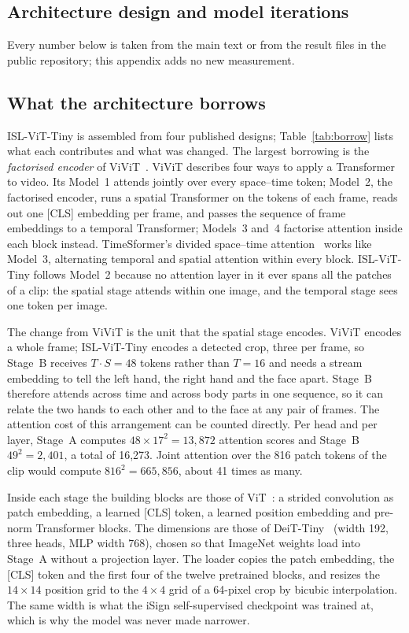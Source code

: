 \documentclass[pdflatex,sn-mathphys-num,twocolumn]{sn-jnl}
\theoremstyle{thmstyleone}%
\begin{document}
\begin{appendices}
\section{Architecture design and model iterations}\label{app:design}

Every number below is taken from the main text or from the result files in the public repository; this appendix adds no new measurement.

\subsection{What the architecture borrows}

ISL-ViT-Tiny is assembled from four published designs; Table~\ref{tab:borrow} lists what each contributes and what was changed. The largest borrowing is the \emph{factorised encoder} of ViViT~\cite{arnab2021vivit}. ViViT describes four ways to apply a Transformer to video. Its Model~1 attends jointly over every space--time token; Model~2, the factorised encoder, runs a spatial Transformer on the tokens of each frame, reads out one [CLS] embedding per frame, and passes the sequence of frame embeddings to a temporal Transformer; Models~3 and~4 factorise attention inside each block instead. TimeSformer's divided space--time attention~\cite{bertasius2021timesformer} works like Model~3, alternating temporal and spatial attention within every block. ISL-ViT-Tiny follows Model~2 because no attention layer in it ever spans all the patches of a clip: the spatial stage attends within one image, and the temporal stage sees one token per image.

The change from ViViT is the unit that the spatial stage encodes. ViViT encodes a whole frame; ISL-ViT-Tiny encodes a detected crop, three per frame, so Stage~B receives $T\cdot S=48$ tokens rather than $T=16$ and needs a stream embedding to tell the left hand, the right hand and the face apart. Stage~B therefore attends across time and across body parts in one sequence, so it can relate the two hands to each other and to the face at any pair of frames. The attention cost of this arrangement can be counted directly. Per head and per layer, Stage~A computes $48\times17^2=13{,}872$ attention scores and Stage~B $49^2=2{,}401$, a total of 16,273. Joint attention over the 816 patch tokens of the clip would compute $816^2=665{,}856$, about 41 times as many.

Inside each stage the building blocks are those of ViT~\cite{dosovitskiy2021vit}: a strided convolution as patch embedding, a learned [CLS] token, a learned position embedding and pre-norm Transformer blocks. The dimensions are those of DeiT-Tiny~\cite{touvron2021deit} (width 192, three heads, MLP width 768), chosen so that ImageNet weights load into Stage~A without a projection layer. The loader copies the patch embedding, the [CLS] token and the first four of the twelve pretrained blocks, and resizes the $14\times14$ position grid to the $4\times4$ grid of a 64-pixel crop by bicubic interpolation. The same width is what the iSign self-supervised checkpoint was trained at, which is why the model was never made narrower.


\end{appendices}
\end{document}
